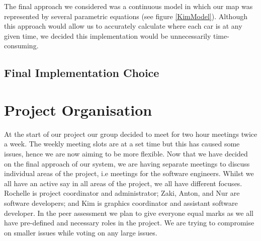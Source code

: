 \documentclass[11pt]{article}
\begin{document}
	The final approach we considered was a continuous model in which our map was represented by several parametric equations (see figure \ref{KimModel}). Although this approach would allow us to accurately calculate where each car is at any given time, we decided this implementation would be unnecessarily time-consuming.  
	

\subsection{Final Implementation Choice}

	
	
	
	\section{Project Organisation}
		At the start of our project our group decided to meet for two hour meetings twice a week. The weekly meeting slots are at a set time but this has caused some issues, hence we are now aiming to be more flexible. Now that we have decided on the final approach of our system, we are having separate meetings to discuss individual areas of the project, i.e meetings for the software engineers. Whilst we all have an active say in all areas of the project, we all have different focuses. Rochelle is project coordinator and administrator; Zaki, Anton, and Nur are software developers; and Kim is graphics coordinator and assistant software developer. In the peer assessment we plan to give everyone equal marks as we all have pre-defined and necessary roles in the project. We are trying to compromise on smaller issues while voting on any large issues. 
		 
\end{document}
